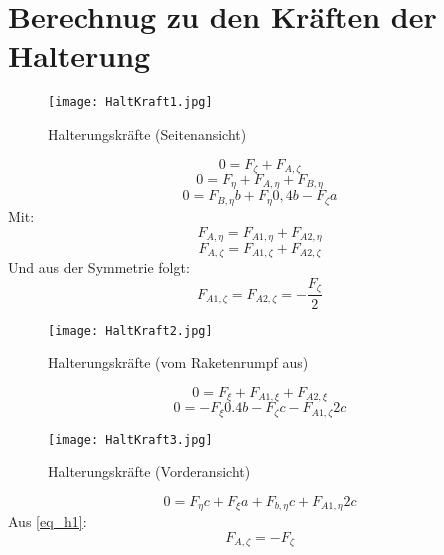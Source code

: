 \chapter{Berechnug zu den Kräften der Halterung}\label{sec:halterkraefte}
\begin{figure}[h] 
	\centering
	\texttt{[image: HaltKraft1.jpg]}
	\caption{Halterungskräfte (Seitenansicht)}
\end{figure}
\begin{equation}\label{eq_h1}
	0 = F_\zeta + F_{A,\zeta}
\end{equation}
\begin{equation}\label{eq_h2}
	0= F_\eta + F_{A,\eta}+F_{B,\eta}
\end{equation}
\begin{equation}\label{eq_h3}
	0 =F_{B,\eta}b +F_\eta 0,4b  - F_\zeta a
\end{equation}
Mit:
\begin{equation}\label{eq_h4}
	F_{A, \eta} = F_{A1, \eta}+F_{A2, \eta}
\end{equation}
\begin{equation}\label{eq_h5}
	F_{A, \zeta} = F_{A1, \zeta}+F_{A2, \zeta}
\end{equation}
Und aus der Symmetrie folgt:
\begin{equation}\label{eq_h6}
	F_{A1, \zeta}=F_{A2, \zeta} = -\frac{F_\zeta}{2}
\end{equation}
\begin{figure}[h] 
\centering
\texttt{[image: HaltKraft2.jpg]}
\caption{Halterungskräfte (vom Raketenrumpf aus)}
\end{figure}
\begin{equation}\label{eq_h7}
	0 = F_\xi + F_{A1,\xi} + F_{A2,\xi}
\end{equation}
\begin{equation}\label{eq_h8}
	0= -F_\xi 0.4b - F_{\zeta}c-F_{A1,\zeta}2c
\end{equation}
\begin{figure}[h] 
\centering
\texttt{[image: HaltKraft3.jpg]}
\caption{Halterungskräfte (Vorderansicht)}
\end{figure}
\begin{equation}\label{eq_h9}
	0= F_\eta c + F_{\xi}a+F_{b,\eta}c+F_{A1,\eta}2c
\end{equation}
Aus \ref{eq_h1}:
\begin{equation}\label{eq_h10}
	F_{A, \zeta} = -F_\zeta
\end{equation}
